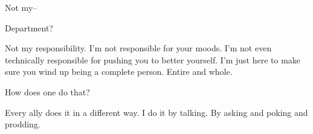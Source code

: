 \begin{paracol}{2}
\begin{leftcolumn}
\begin{ally}
Not my--
\end{ally}
Department?

\begin{ally}
Not my responsibility. I'm not responsible for your moods. I'm not even technically responsible for pushing you to better yourself. I'm just here to make sure you wind up being a complete person. Entire and whole.
\end{ally}
How does one do that?

\begin{ally}
Every ally does it in a different way. I do it by talking. By asking and poking and prodding.
\end{ally}
\newpage
\end{leftcolumn}
\end{paracol}
